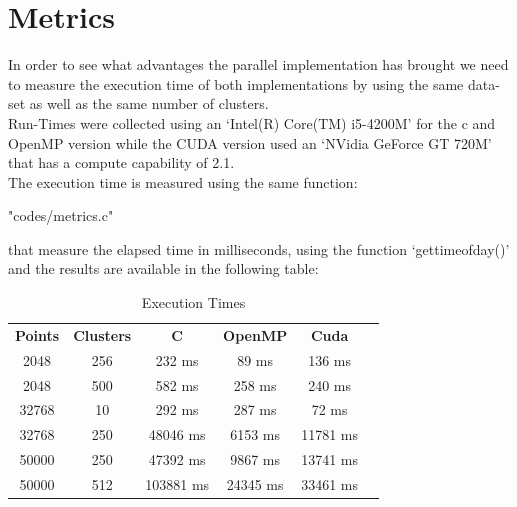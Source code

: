 \documentclass[10pt,twocolumn,letterpaper]{article}
\begin{document}
\section{Metrics}
In order to see what advantages the parallel implementation has brought we need to measure the execution time of both 
implementations by using the same data-set as well as the same number of clusters.\\
Run-Times were collected using an `Intel(R) Core(TM) i5-4200M' for the c and OpenMP version while the CUDA version used an
`NVidia GeForce GT 720M' that has a compute capability of 2.1.\\
The execution time is measured using the same function:\\
\begin{lstinputlisting}[language=C,style=CSnippetStyle,caption=Time Function,firstline=1,lastline=13]{
	"codes/metrics.c"}
\end{lstinputlisting}
that measure the elapsed time in milliseconds, using the function `gettimeofday()' and the results are available in the following table:
\\
\begin{table}[H]
\centering
\begin{tabular}{@{}cccccc@{}}
\textbf{Points} & \textbf{Clusters} & \textbf{C} & \textbf{OpenMP} & \textbf{Cuda} \\
2048 & 256 & 232 ms & 89 ms & 136 ms \\
2048 & 500 & 582 ms & 258 ms & 240 ms \\
32768 & 10 & 292 ms & 287 ms & 72 ms \\
32768 & 250 & 48046 ms & 6153 ms & 11781 ms \\
50000 & 250 & 47392 ms & 9867 ms & 13741 ms \\
50000 & 512 & 103881 ms & 24345 ms & 33461 ms \\
\end{tabular}
\caption{Execution Times}
\end{table}
\end{document}
